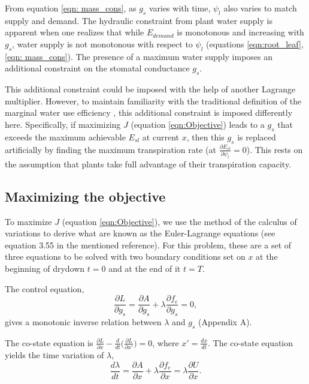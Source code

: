 \documentclass[utf8]{frontiersSCNS} %
\begin{document}
From equation \ref{eqn: mass_cons}, as $g_s$ varies with time, $\psi_l$ also varies to match supply and demand. The hydraulic constraint from plant water supply is apparent when one realizes that while $E_{demand}$ is monotonous and increasing with $g_s$, water supply is not monotonous with respect to $\psi_l$ (equations \ref{eqn:root_leaf}, \ref{eqn: mass_cons}). The presence of a maximum water supply imposes an additional constraint on the stomatal conductance $g_s$. 

This additional constraint could be imposed with the help of another Lagrange multiplier. However, to maintain familiarity with the traditional definition of the marginal water use efficiency \citep{cowan1977}, this additional constraint is imposed differently here. Specifically, if maximizing $J$ (equation \ref{eqn:Objective}) leads to a $g_s$ that exceeds the maximum achievable $E_{sl}$ at current $x$, then this $g_s$ is replaced artificially by finding the maximum transpiration rate \Big(at $\frac{\partial E_{sl}}{\partial \psi_l} = 0$\Big). This rests on the assumption that plants take full advantage of their transpiration capacity.

\subsection{Maximizing the objective}

To maximize $J$ (equation \ref{eqn:Objective}), we use the method of the calculus of variations \citep{witelski2015} to derive what are known as the Euler-Lagrange equations (see equation 3.55 in the mentioned reference). For this problem, these are a set of three equations to be solved with two boundary conditions set on $x$ at the beginning of drydown $t=0$ and at the end of it $t=T$.

The control equation,
\begin{equation}
    \label{eqn:control}
    \frac{\partial L}{\partial g_s} = \frac{\partial A}{\partial g_s} + \lambda \frac{\partial f_e}{\partial g_s} = 0,
\end{equation}
gives a monotonic inverse relation between $\lambda$ and $g_s$ (Appendix A).

The co-state equation is $\frac{\partial L}{\partial x} - \frac{d}{dt} \Big(\frac{\partial L}{\partial x'} \Big) = 0$, where $x'= \frac{dx}{dt}$. The co-state equation yields the time variation of $\lambda$,
\begin{equation}
    \label{eqn:co_state}
    \frac{d \lambda}{dt} = \frac{\partial A}{\partial x} + \lambda \frac{\partial f_e}{\partial x} = \lambda \frac{\partial U}{\partial x}.
\end{equation}
\end{document}
